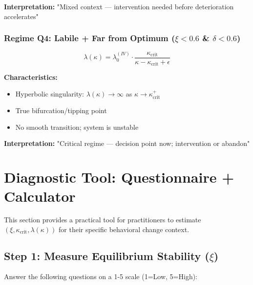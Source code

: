 \documentclass[11pt, a4paper]{article}
\begin{document}
\noindent
\textbf{Interpretation:} "Mixed context — intervention needed before deterioration accelerates"

\subsubsection{Regime Q4: Labile + Far from Optimum ($\xi < 0.6$ \& $\delta < 0.6$)}

\begin{equation}
\lambda(\kappa) = \lambda_0^{(IV)} \cdot \frac{\kappa_{\text{crit}}}{\kappa - \kappa_{\text{crit}} + \epsilon}
\end{equation}

\noindent
\textbf{Characteristics:}
\begin{itemize}
    \item Hyperbolic singularity: $\lambda(\kappa) \to \infty$ as $\kappa \to \kappa_{\text{crit}}^+$
    \item True bifurcation/tipping point
    \item No smooth transition; system is unstable
\end{itemize}

\noindent
\textbf{Interpretation:} "Critical regime — decision point now; intervention or abandon"


\section{Diagnostic Tool: Questionnaire + Calculator}

This section provides a practical tool for practitioners to estimate $(\xi, \kappa_{\text{crit}}, \lambda(\kappa))$
for their specific behavioral change context.

\subsection{Step 1: Measure Equilibrium Stability ($\xi$)}

Answer the following questions on a 1-5 scale (1=Low, 5=High):
\end{document}
